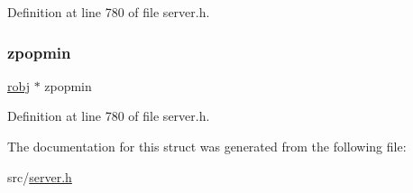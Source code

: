 Definition at line 780 of file server.\+h.

\mbox{\label{structshared_objects_struct_a068ba9c2967d8f0f639a27df62d9122d}} 
\subsubsection{\texorpdfstring{zpopmin}{zpopmin}}
{\footnotesize\ttfamily \hyperlink{server_8h_a540f174d2685422fbd7d12e3cd44c8e2}{robj} $\ast$ zpopmin}



Definition at line 780 of file server.\+h.



The documentation for this struct was generated from the following file\+:\begin{DoxyCompactItemize}
\item 
src/\hyperlink{server_8h}{server.\+h}\end{DoxyCompactItemize}
